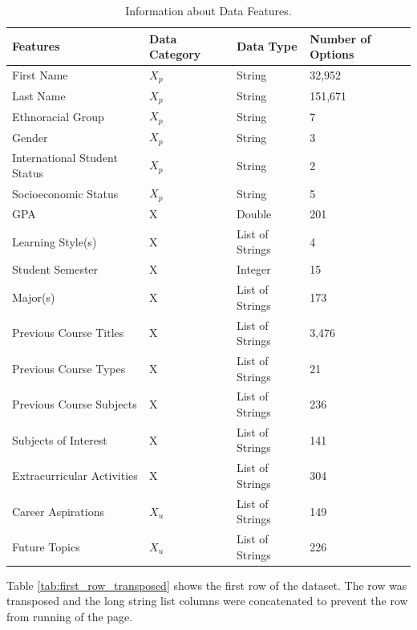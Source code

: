 \documentclass{article}
\begin{document}
\begin{table}[htbp]
    \centering
    \begin{tabular}{|l|l|l|l|}
        \hline
        \textbf{Features} & \textbf{Data Category} & \textbf{Data Type} & \textbf{Number of Options}\\ \hline
        First Name & $X_p$ & String & 32,952 \\ \hline
        Last Name & $X_p$ & String & 151,671 \\ \hline
        Ethnoracial Group & $X_p$ & String & 7 \\ \hline
        Gender & $X_p$ & String & 3 \\ \hline
        International Student Status & $X_p$ & String & 2 \\ \hline
        Socioeconomic Status & $X_p$ & String & 5 \\ \hline
        GPA & X & Double & 201 \\ \hline
        Learning Style(s) & X & List of Strings & 4 \\ \hline
        Student Semester & X & Integer & 15 \\ \hline
        Major(s) & X & List of Strings & 173 \\ \hline
        Previous Course Titles & X & List of Strings & 3,476 \\ \hline
        Previous Course Types & X & List of Strings & 21 \\ \hline
        Previous Course Subjects & X & List of Strings & 236 \\ \hline
        Subjects of Interest & X & List of Strings & 141 \\ \hline
        Extracurricular Activities & X & List of Strings & 304 \\ \hline
        Career Aspirations & $X_u$ & List of Strings & 149 \\ \hline
        Future Topics & $X_u$ & List of Strings & 226 \\ \hline
    \end{tabular}
    \caption{Information about Data Features.}
    \label{tab:features_table}
\end{table}

Table \ref{tab:first_row_transposed} shows the first row of the dataset. The row was transposed and the long string list columns were concatenated to prevent the row from running of the page.
\end{document}
